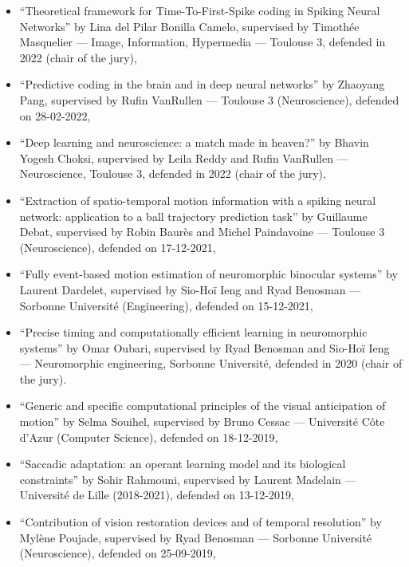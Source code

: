 \documentclass[10pt,english,a4paper,oneside]{article}%
\begin{document}
\begin{itemize}
    \item ``Theoretical framework for Time-To-First-Spike coding in Spiking Neural Networks'' by Lina del Pilar Bonilla Camelo, supervised by Timothée Masquelier --- Image, Information, Hypermedia --- Toulouse 3, defended in 2022 (chair of the jury),

	\item ``Predictive coding in the brain and in deep neural networks'' 	by Zhaoyang Pang, supervised by Rufin VanRullen --- Toulouse 3 (Neuroscience), defended on 28-02-2022,

    \item ``Deep learning and neuroscience: a match made in heaven?'' by Bhavin Yogesh Choksi, supervised by Leila Reddy and Rufin VanRullen --- Neuroscience, Toulouse 3, defended in 2022 (chair of the jury),

	\item ``Extraction of spatio-temporal motion information with a spiking neural network: application to a ball trajectory prediction task'' by Guillaume Debat, supervised by Robin Baurès and Michel Paindavoine --- Toulouse 3 (Neuroscience), defended on 17-12-2021,

	\item ``Fully event-based motion estimation of neuromorphic binocular systems'' by Laurent Dardelet, supervised by Sio-Hoï Ieng and Ryad Benosman --- Sorbonne Université (Engineering), defended on 15-12-2021,

	\item ``Precise timing and computationally efficient learning in neuromorphic systems'' by Omar Oubari, supervised by Ryad Benosman and Sio-Hoï Ieng --- Neuromorphic engineering, Sorbonne Université, defended in 2020 (chair of the jury).

	\item ``Generic and specific computational principles of the visual anticipation of motion'' by Selma Souihel, supervised by Bruno Cessac --- Université Côte d'Azur (Computer Science), defended on 18-12-2019,

	\item ``Saccadic adaptation: an operant learning model and its biological constraints'' by Sohir Rahmouni, supervised by Laurent Madelain --- Université de Lille (2018-2021), defended on 13-12-2019,

	\item ``Contribution of vision restoration devices and of temporal resolution''  by Mylène Poujade, supervised by Ryad Benosman --- Sorbonne Université (Neuroscience), defended on 25-09-2019,


\end{itemize}
\end{document}
